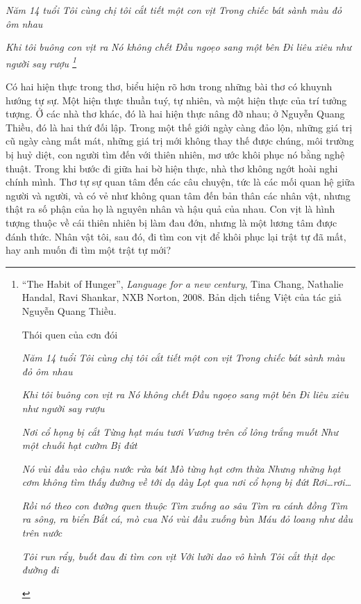\documentclass[../main.tex]{subfiles}
\begin{document}
\begin{multicols}{2}
\begin{blockquote}
\textit{Năm 14 tuổi}        
\textit{Tôi cùng chị tôi cắt tiết một con vịt} 
\textit{Trong chiếc bát sành màu đỏ ôm nhau} 
        
\textit{Khi tôi buông con vịt ra}        
\textit{Nó không chết}        
\textit{Đầu ngoẹo sang một bên} 
\textit{Đi liêu xiêu như người say rượu \footnote{
“The Habit of Hunger”, \textit{Language for a new century}, Tina Chang, Nathalie Handal, Ravi Shankar, NXB Norton, 2008. Bản dịch tiếng Việt của tác giả Nguyễn Quang Thiều.  
\begin{blockquote}
 
Thói quen của cơn đói 
 
\textit{Năm 14 tuổi} 
\textit{Tôi cùng chị tôi cắt tiết một con vịt} 
\textit{Trong chiếc bát sành màu đỏ ôm nhau} 
 
\textit{Khi tôi buông con vịt ra} 
\textit{Nó không chết} 
\textit{Đầu ngoẹo sang một bên} 
\textit{Đi liêu xiêu như người say rượu} 
 
\textit{ 	Nơi cổ họng bị cắt} 
\textit{Từng hạt máu tươi} 
\textit{Vương trên cổ lông trắng muốt} 
\textit{Như một chuỗi hạt cườm} 
\textit{Bị đứt} 
 
\textit{Nó vùi đầu vào chậu nước rửa bát} 
\textit{Mò từng hạt cơm thừa} 
\textit{Nhưng những hạt cơm không tìm thấy đường về tới dạ dày} 
\textit{Lọt qua nơi cổ họng bị đứt} 
\textit{Rơi…rơi…} 
 
\textit{Rồi nó theo con đường quen thuộc} 
\textit{Tìm xuống ao sâu} 
\textit{Tìm ra cánh đồng} 
\textit{Tìm ra sông, ra biển} 
\textit{Bắt cá, mò cua} 
\textit{Nó vùi đầu xuống bùn} 
\textit{Máu đỏ loang như dầu trên nước} 
 
\textit{Tôi run rẩy, buốt đau đi tìm con vịt} 
\textit{Với lưỡi dao vô hình} 
\textit{Tôi cắt thịt dọc đường đi} 

\end{blockquote}} } 

\end{blockquote}
 
Có hai hiện thực trong thơ, biểu hiện rõ hơn trong những bài thơ có khuynh hướng tự sự. Một hiện thực thuần tuý, tự nhiên, và một hiện thực của trí tưởng tượng. Ở các nhà thơ khác, đó là hai hiện thực nâng đỡ nhau; ở Nguyễn Quang Thiều, đó là hai thứ đối lập. Trong một thế giới ngày càng đảo lộn, những giá trị cũ ngày càng mất mát, những giá trị mới không thay thế được chúng, môi trường bị huỷ diệt, con người tìm đến với thiên nhiên, mơ ước khôi phục nó bằng nghệ thuật. Trong khi bước đi giữa hai bờ hiện thực, nhà thơ không ngớt hoài nghi chính mình. Thơ tự sự quan tâm đến các câu chuyện, tức là các mối quan hệ giữa người và người, và có vẻ như không quan tâm đến bản thân các nhân vật, nhưng thật ra số phận của họ là nguyên nhân và hậu quả của nhau. Con vịt là hình tượng thuộc về cái thiên nhiên bị làm đau đớn, nhưng là một lương tâm được đánh thức. Nhân vật tôi, sau đó, đi tìm con vịt để khôi phục lại trật tự đã mất, hay anh muốn đi tìm một trật tự mới?    
 

\end{multicols}
\end{document}
